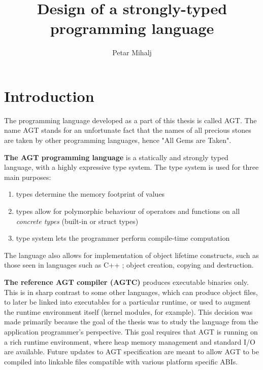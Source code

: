 \documentclass[times, utf8, diplomski]{fer}
\theoremstyle{definition}
\begin{document}
\sloppy
{}

\title{Design of a strongly-typed programming language}

\author{Petar Mihalj}

\maketitle




\tableofcontents

\chapter{Introduction}\label{chap:intro}

The programming language developed as a part of this thesis is called AGT.
The name AGT stands for an unfortunate fact that the names of all precious stones
are taken by other programming languages, hence "All Gems are Taken".

\textbf{The AGT programming language} is a statically \citep{c_static_typing} and 
strongly \citep{c_strong_typing} typed language, with a highly expressive type system.
The type system is used for three main purposes:

\begin{enumerate}
    \item types determine the memory footprint of values 
    \item types allow for polymorphic behaviour of operators and functions on all 
        \textit{concrete types} (built-in or struct types)
    \item type system lets the programmer perform compile-time computation
\end{enumerate}

The language also allows for implementation of object lifetime constructs, 
such as those seen in languages such as C++ \citep{c_cpp_lifetime}; 
object creation, copying and destruction.

\textbf{The reference AGT compiler (AGTC)} produces executable binaries only.
This is in sharp contrast to some other languages, which can produce object files, 
to later be linked into executables for a particular runtime, 
or used to augment the runtime environment itself (kernel modules, for example). 
This decision was made primarily because the goal of the thesis was to study the language 
from the application programmer's perspective. 
This goal requires that AGT is running on a rich runtime environment, 
where heap memory management and standard I/O are available.
Future updates to AGT specification are meant to allow AGT to be compiled
into linkable files compatible with various platform specific ABIs.
\end{document}
